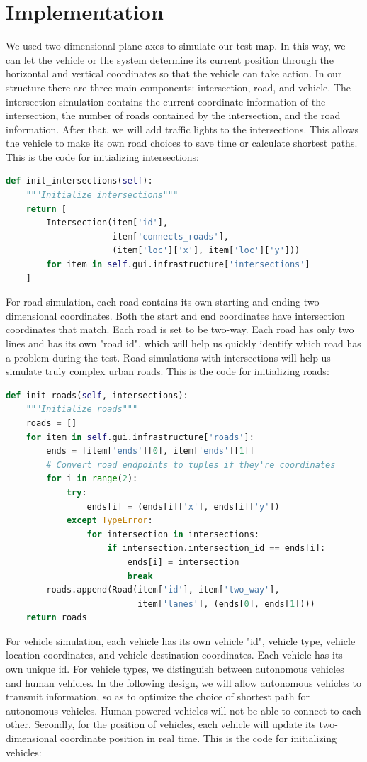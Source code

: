 \documentclass[onecolumn, draftclsnofoot,10pt, compsoc]{IEEEtran}
\begin{document}
\section{Implementation}
We used two-dimensional plane axes to simulate our test map. In this way, we can let the vehicle or the system determine its current position through the horizontal and vertical coordinates so that the vehicle can take action. In our structure there are three main components: intersection, road, and vehicle. The intersection simulation contains the current coordinate information of the intersection, the number of roads contained by the intersection, and the road information. After that, we will add traffic lights to the intersections. This allows the vehicle to make its own road choices to save time or calculate shortest paths. This is the code for initializing intersections:
\begin{lstlisting}[language=Python]
def init_intersections(self):
    """Initialize intersections"""
    return [
        Intersection(item['id'],
                     item['connects_roads'],
                     (item['loc']['x'], item['loc']['y']))
        for item in self.gui.infrastructure['intersections']
    ]
\end{lstlisting}
For road simulation, each road contains its own starting and ending two-dimensional coordinates. Both the start and end coordinates have intersection coordinates that match. Each road is set to be two-way. Each road has only two lines and has its own "road id", which will help us quickly identify which road has a problem during the test. Road simulations with intersections will help us simulate truly complex urban roads. This is the code for initializing roads:
\begin{lstlisting}[language=Python]
def init_roads(self, intersections):
    """Initialize roads"""
    roads = []
    for item in self.gui.infrastructure['roads']:
        ends = [item['ends'][0], item['ends'][1]]
        # Convert road endpoints to tuples if they're coordinates
        for i in range(2):
            try:
                ends[i] = (ends[i]['x'], ends[i]['y'])
            except TypeError:
                for intersection in intersections:
                    if intersection.intersection_id == ends[i]:
                        ends[i] = intersection
                        break
        roads.append(Road(item['id'], item['two_way'],
                          item['lanes'], (ends[0], ends[1])))
    return roads
\end{lstlisting}
For vehicle simulation, each vehicle has its own vehicle "id", vehicle type, vehicle location coordinates, and vehicle destination coordinates. Each vehicle has its own unique id. For vehicle types, we distinguish between autonomous vehicles and human vehicles. In the following design, we will allow autonomous vehicles to transmit information, so as to optimize the choice of shortest path for autonomous vehicles. Human-powered vehicles will not be able to connect to each other. Secondly, for the position of vehicles, each vehicle will update its two-dimensional coordinate position in real time. This is the code for initializing vehicles:
\end{document}
